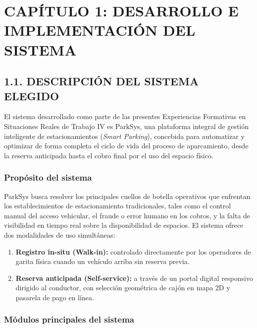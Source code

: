 \section{CAPÍTULO 1: DESARROLLO E IMPLEMENTACIÓN DEL SISTEMA}

\subsection{1.1. DESCRIPCIÓN DEL SISTEMA ELEGIDO}



El sistema desarrollado como parte de las presentes Experiencias Formativas en Situaciones Reales de Trabajo IV es ParkSys, una plataforma integral de gestión inteligente de estacionamientos (\textit{Smart Parking}), concebida para automatizar y optimizar de forma completa el ciclo de vida del proceso de aparcamiento, desde la reserva anticipada hasta el cobro final por el uso del espacio físico.

\subsubsection{Propósito del sistema}



ParkSys busca resolver los principales cuellos de botella operativos que enfrentan los establecimientos de estacionamiento tradicionales, tales como el control manual del acceso vehicular, el fraude o error humano en los cobros, y la falta de visibilidad en tiempo real sobre la disponibilidad de espacios. El sistema ofrece dos modalidades de uso simultáneas:

\begin{enumerate}
    \item \textbf{Registro in-situ (Walk-in):} controlado directamente por los operadores de garita física cuando un vehículo arriba sin reserva previa.
    \item \textbf{Reserva anticipada (Self-service):} a través de un portal digital responsivo dirigido al conductor, con selección geométrica de cajón en mapa 2D y pasarela de pago en línea.
\end{enumerate}

\subsubsection{Módulos principales del sistema}




